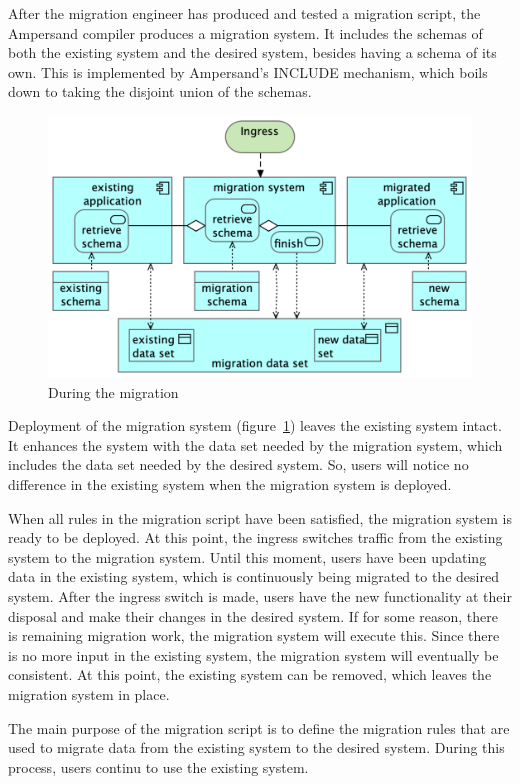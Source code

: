 \documentclass{elsarticle}
\begin{document}
   After the migration engineer has produced and tested a migration script, the Ampersand compiler produces a migration system.
   It includes the schemas of both the existing system and the desired system, besides having a schema of its own.
   This is implemented by Ampersand's INCLUDE mechanism, which boils down to taking the disjoint union of the schemas.
\begin{figure}
   \centering
   \includegraphics[scale=0.1]{figures/During migration.png}
   \caption{During the migration}
   \label{fig:during}
\end{figure}
   Deployment of the migration system (figure~\ref{fig:during}) leaves the existing system intact.
   It enhances the system with the data set needed by the migration system, which includes the data set needed by the desired system.
   So, users will notice no difference in the existing system when the migration system is deployed.

   When all rules in the migration script have been satisfied, the migration system is ready to be deployed.
   At this point, the ingress switches traffic from the existing system to the migration system.
   Until this moment, users have been updating data in the existing system, which is continuously being migrated to the desired system.
   After the ingress switch is made, users have the new functionality at their disposal and make their changes in the desired system.
   If for some reason, there is remaining migration work, the migration system will execute this.
   Since there is no more input in the existing system, the migration system will eventually be consistent.
   At this point, the existing system can be removed, which leaves the migration system in place.


   The main purpose of the migration script is to define the migration rules that are used to migrate data from the existing system to the desired system.
   During this process, users continu to use the existing system.
\end{document}
